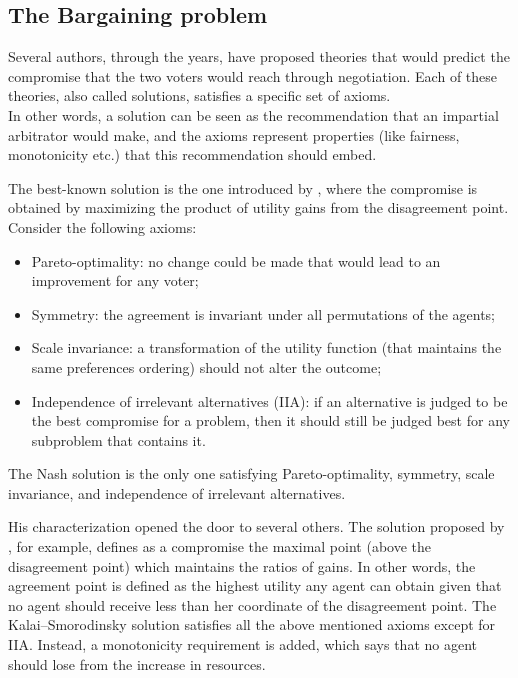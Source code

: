 \documentclass[version=3.21, pagesize, twoside=off, bibliography=totoc, DIV=calc, fontsize=12pt, a4paper]{scrartcl}
\begin{document}
\subsection{The Bargaining problem}
Several authors, through the years, have proposed theories that would predict the compromise that the two voters would reach through negotiation. 
Each of these theories, also called solutions, satisfies a specific set of axioms.
\\ 
In other words, a solution can be seen as the recommendation that an impartial arbitrator would make, and the axioms represent properties (like fairness, monotonicity etc.) that this recommendation should embed. 

The best-known solution is the one introduced by \citet{Nash1950}, where the compromise is obtained by maximizing the product of utility gains from the disagreement point.
Consider the following axioms:
\begin{itemize}
	\item Pareto-optimality: no change could be made that would lead to an improvement for any voter;
	\item Symmetry: the agreement is invariant under all permutations of the agents;
	\item Scale invariance: a transformation of the utility function (that maintains the same preferences ordering) should not alter the outcome;
	\item Independence of irrelevant alternatives (IIA): if an alternative is judged to be the best compromise for a problem, then it should still be judged best for any subproblem that contains it.
\end{itemize}

The Nash solution is the only one satisfying Pareto-optimality, symmetry, scale invariance, and independence of irrelevant alternatives.

His characterization opened the door to several others. The solution proposed by \cite{Kalai1975}, for example, defines as a compromise the maximal point (above the disagreement point) which maintains the ratios of gains. In other words, the agreement point is defined as the highest utility any agent can obtain given that no agent should receive less than her coordinate of the disagreement point.
The Kalai–Smorodinsky solution satisfies all the above mentioned axioms except for IIA. Instead, a monotonicity requirement is added, which says that no agent should lose from the increase in resources.
\end{document}
